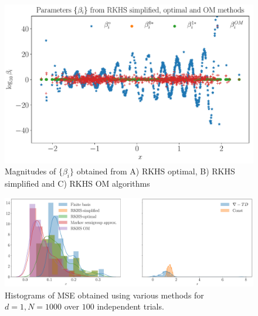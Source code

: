 \begin{figure}
	\centering
	\includegraphics[width=5in]{images/Chap4_beta_comparison}
	\caption[RKHS and coifman performance]{Magnitudes of $\{\beta_i\}$ obtained from A) RKHS optimal, B) RKHS simplified and C) RKHS OM algorithms}
	\label{fig:beta_comparison}
\end{figure}

\begin{figure}
	\centering
	\includegraphics[width=6in]{images/Chap4_hist_mse_d1_runs100}
	\caption[RKHS and coifman performance]{Histograms of MSE obtained using various methods for $d=1,N=1000$ over $100$ independent trials.}
	\label{fig:hist_mse}
\end{figure}

